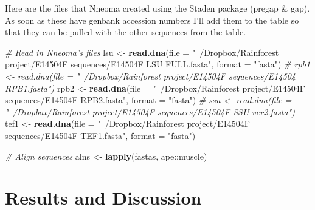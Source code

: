 \documentclass[11pt,]{article}
\newenvironment{Shaded}{\begin{snugshade}}{\end{snugshade}}
\newcommand{\KeywordTok}[1]{\textcolor[rgb]{0.13,0.29,0.53}{\textbf{{#1}}}}
\newcommand{\DataTypeTok}[1]{\textcolor[rgb]{0.13,0.29,0.53}{{#1}}}
\newcommand{\StringTok}[1]{\textcolor[rgb]{0.31,0.60,0.02}{{#1}}}
\newcommand{\CommentTok}[1]{\textcolor[rgb]{0.56,0.35,0.01}{\textit{{#1}}}}
\newcommand{\NormalTok}[1]{{#1}}
\begin{document}
Here are the files that Nneoma created using the Staden package (pregap
\& gap). As soon as these have genbank accession numbers I'll add them
to the table so that they can be pulled with the other sequences from
the table.

\begin{Shaded}
\begin{Highlighting}[]
\CommentTok{# Read in Nneoma's files}
\NormalTok{lsu <-}\StringTok{ }\KeywordTok{read.dna}\NormalTok{(}\DataTypeTok{file =} \StringTok{"~/Dropbox/Rainforest project/E14504F sequences/E14504F LSU FULL.fasta"}\NormalTok{, }\DataTypeTok{format =} \StringTok{"fasta"}\NormalTok{)}
\CommentTok{# rpb1 <- read.dna(file = "~/Dropbox/Rainforest project/E14504F sequences/E14504 RPB1.fasta")}
\NormalTok{rpb2 <-}\StringTok{ }\KeywordTok{read.dna}\NormalTok{(}\DataTypeTok{file =} \StringTok{"~/Dropbox/Rainforest project/E14504F sequences/E14504F RPB2.fasta"}\NormalTok{, }\DataTypeTok{format =} \StringTok{"fasta"}\NormalTok{)}
\CommentTok{# ssu <- read.dna(file = "~/Dropbox/Rainforest project/E14504F sequences/E14504F SSU ver2.fasta")}
\NormalTok{tef1 <-}\StringTok{ }\KeywordTok{read.dna}\NormalTok{(}\DataTypeTok{file =} \StringTok{"~/Dropbox/Rainforest project/E14504F sequences/E14504F TEF1.fasta"}\NormalTok{, }\DataTypeTok{format =} \StringTok{"fasta"}\NormalTok{)}
\end{Highlighting}
\end{Shaded}

\begin{Shaded}
\begin{Highlighting}[]
\CommentTok{# Align sequences}
\NormalTok{alns <-}\StringTok{ }\KeywordTok{lapply}\NormalTok{(fastas, ape::muscle)}
\end{Highlighting}
\end{Shaded}

\section{Results and Discussion}\label{results-and-discussion}

\renewcommand\refname{References}

\end{document}
